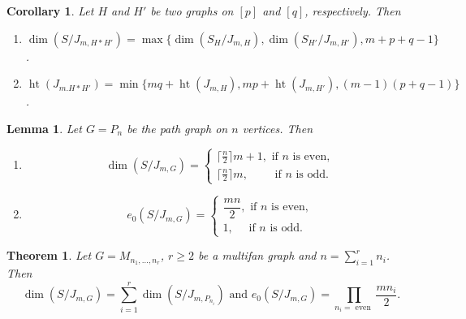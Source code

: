 \documentclass[10pt,a4paper]{amsart}
\newtheorem{theorem}{Theorem}
\newtheorem{corollary}{Corollary}
\newtheorem{lemma}{Lemma}
\DeclareMathOperator{\height}{ht}
\begin{document}
 \begin{corollary}\label{cor: dim of join of graphs}
    Let $H$ and $H'$ be two graphs on $[p]$ and $[q]$, respectively. Then 
    \begin{enumerate}
        \item $\dim(S/J_{m,H*H'})=\max\{\dim(S_H/J_{m,H}),\dim(S_{H'}/J_{m,H'}),m+p+q-1\}$.
        \item $\height(J_{m.H*H'})=\min\{mq+\height(J_{m,H}),mp+\height(J_{m,H'}),(m-1)(p+q-1)\}$.
    \end{enumerate}
\end{corollary} 

\begin{lemma}\label{lemma: dimension and multiplicity of path graphs}
    Let $G=P_n$ be the path graph on $n$ vertices. Then
    \begin{enumerate}
        \item \label{lemma: dimension of path graphs} $$ \dim(S/J_{m,G})=
    \begin{cases}
        \lceil\frac{n}{2}\rceil m+1, \text{ if $n$ is even},\\
        \lceil\frac{n}{2}\rceil m,\quad\quad\text{ if $n$ is odd}.
    \end{cases}$$
    \item \label{lemma: multiplicity of path graphs} $$ e_0(S/J_{m,G})=
    \begin{cases}
        \dfrac{mn}{2}, \text{ if $n$ is even},\\
       1,\quad\text{  if $n$ is odd}.
    \end{cases}$$
    \end{enumerate}
\end{lemma}

\begin{theorem}\label{thm: hs of multifan graph}
    Let $G=M_{n_1,\ldots,n_r}$, $r\geq 2$ be a multifan graph and $n=\sum_{i=1}^rn_i$. Then $$\dim(S/J_{m,G})=\sum_{i=1}^r\dim(S/J_{m,P_{n_i}})\text{ and }e_0(S/J_{m,G})=\prod_{n_i=\text{ even }}\dfrac{mn_i}{2}.$$
\end{theorem}
\end{document}
